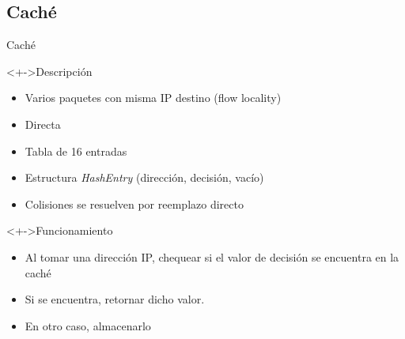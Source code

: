 \documentclass[xcolor=dvipsnames]{beamer}
\begin{document}
\subsection{Caché}

\begin{frame}{Caché}
  \begin{block}<+->{Descripción} 	
    \begin{itemize}
      \scriptsize
        \item Varios paquetes con misma IP destino (flow locality)
     	\item Directa
	\item Tabla de 16 entradas
	\item Estructura \textit{HashEntry} (dirección, decisión, vacío)
	\item Colisiones se resuelven por reemplazo directo
     \end{itemize}
  \end{block}
  
  \begin{block}<+->{Funcionamiento} 	
    \begin{itemize}
      \scriptsize
     	\item Al tomar una dirección IP, chequear si el valor de decisión se encuentra en la caché
	\item Si se encuentra, retornar dicho valor.
	\item En otro caso, almacenarlo
     \end{itemize}
  \end{block}
\end{frame}
\end{document}
